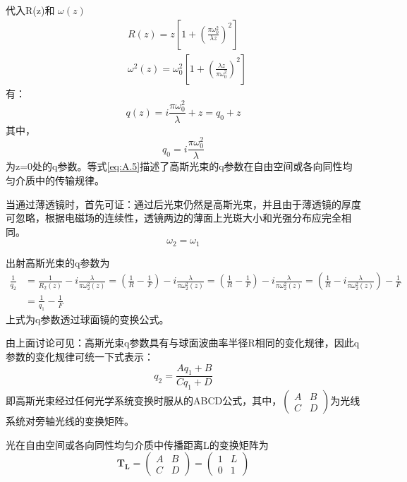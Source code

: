 \documentclass[14pt,a4paper,oneside]{article}
\numberwithin{equation}{subsection}             %
\numberwithin{figure}{subsection}               %
\begin{document}
代入R(z)和 $\omega(z)$
\begin{equation}
    \begin{aligned}
    &R(z)=z\left[1+\left(\frac{\pi\omega_0^2}{\lambda z}\right)^2\right]\\
    &\omega^2(z)=\omega_0^2\left[1+\left(\frac{\lambda z}{\pi \omega_0^2}\right)^2\right]
    \end{aligned}
    \label{eq:A.4}
\end{equation}
有：
\begin{equation}
    q(z)=i\frac{\pi\omega_0^2}{\lambda}+z=q_0+z
    \label{eq:A.5}
\end{equation}
其中，
\begin{equation}
    q_0=i\frac{\pi\omega_0^2}{\lambda}
    \label{eq:A.6}
\end{equation}
为z=0处的q参数。等式\ref{eq:A.5}描述了高斯光束的q参数在自由空间或各向同性均匀介质中的传输规律。

当通过薄透镜时，首先可证：通过后光束仍然是高斯光束，并且由于薄透镜的厚度可忽略，根据电磁场的连续性，透镜两边的薄面上光斑大小和光强分布应完全相同。
\begin{equation}
    \omega_2=\omega_1
    \label{eq:A.7}
\end{equation}

出射高斯光束的q参数为
\begin{equation}
    \begin{aligned}
    \frac{1}{q_2}&=\frac{1}{R_2(z)}-i\frac{\lambda}{\pi\omega_2^2(z)} =\left(\frac{1}{R}-\frac{1}{F}\right)-i\frac{\lambda}{\pi\omega_2^2(z)}=\left(\frac{1}{R}-\frac{1}{F}\right)-i\frac{\lambda}{\pi\omega_2^2(z)}=\left(\frac{1}{R}-i\frac{\lambda}{\pi\omega_2^2(z)}\right)-\frac{1}{F}\\
    &=\frac{1}{q_1}-\frac{1}{F}
    \end{aligned}
    \label{eq:A.8}
\end{equation}
上式为q参数透过球面镜的变换公式。

由上面讨论可见：高斯光束q参数具有与球面波曲率半径R相同的变化规律，因此q参数的变化规律可统一下式表示：
\begin{equation}
    q_2=\frac{Aq_1+B}{Cq_1+D} 
    \label{eq:A.9}
\end{equation}
即高斯光束经过任何光学系统变换时服从的ABCD公式，其中，$\begin{pmatrix}
    A&B\\
    C&D
\end{pmatrix}$为光线系统对旁轴光线的变换矩阵。

光在自由空间或各向同性均匀介质中传播距离L的变换矩阵为
\begin{equation}
    \mathbf{T_L}=\begin{pmatrix}
        A&B\\
        C&D
    \end{pmatrix}=\begin{pmatrix}
        1&L\\
        0&1
    \end{pmatrix}
    \label{eq:A.10}
\end{equation}
\end{document}
